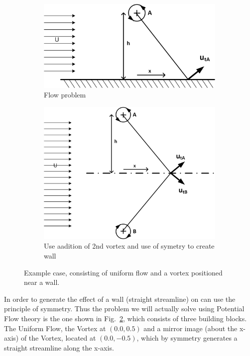 \documentclass[10pt,a4paper]{article}
\begin{document}
\begin{figure}[h]
\begin{subfigure}{0.48\textwidth}
    \includegraphics[width=1.0\textwidth]{Figures/Vortex_wall_1}
  \caption{Flow problem}\label{F_vortex_near_wall_a}
\end{subfigure}
\hfill
\begin{subfigure}{0.48\textwidth}
    \includegraphics[width=1.0\textwidth]{Figures/Vortex_wall_2}
  \caption{Use aadition of 2nd vortex and use of symetry to create wall}\label{F_vortex_near_wall_b}
\end{subfigure}
\caption{Example case, consisting of uniform flow and a vortex positioned near a wall.}
\label{F_vortex_near_wall}
\end{figure}


In order to generate the effect of a wall (straight streamline) on can use the principle of symmetry.
Thus the problem we will actually solve using Potential Flow theory is the one shown in Fig.~\ref{F_vortex_near_wall_b}, which consists of three building blocks.
The Uniform Flow, the Vortex at $(0.0, 0.5)$ and a mirror image (about the x-axis) of the Vortex, located at $(0.0,-0.5)$, which by symmetry generates a straight streamline along the x-axis. 
\end{document}
